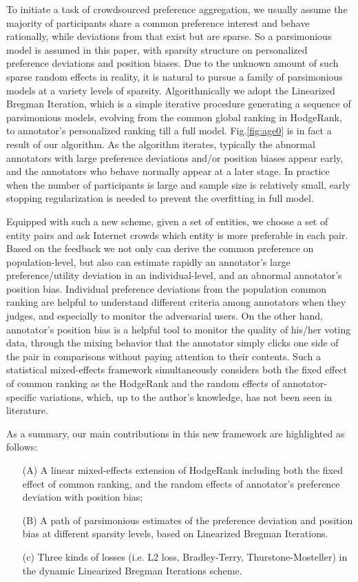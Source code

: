 \documentclass[10pt,journal,cspaper,compsoc]{IEEEtran}
\begin{document}
To initiate a task of crowdsourced preference aggregation, we usually assume the majority of participants share a common preference interest and behave rationally, while deviations from that exist but are sparse. So a parsimonious model is assumed in this paper, with sparsity structure on personalized preference deviations and position biases. Due to the unknown amount of such sparse random effects in reality, it is natural to pursue a family of parsimonious models at a variety levels of sparsity. Algorithmically we adopt the Linearized Bregman Iteration, which is a simple iterative procedure generating a sequence of parsimonious models, evolving from the common global ranking in HodgeRank, to annotator's personalized ranking till a full model. Fig.\ref{fig:age0} is in fact a result of our algorithm. As the algorithm iterates, typically the abnormal annotators with large preference deviations and/or position biases appear early, and the annotators who behave normally appear at a later stage. In practice when the number of participants is large and sample size is relatively small, early stopping regularization is needed to prevent the overfitting in full model.

Equipped with such a new scheme, given a set of entities, we choose a
set of entity pairs and ask Internet crowds which entity is more preferable
in each pair. Based on the feedback we not only can derive the common preference on population-level, but also can estimate rapidly an annotator's large preference/utility deviation in an individual-level, and an abnormal annotator's position bias. Individual preference deviations from the population common ranking are helpful to understand different criteria among annotators when they judges, and especially to monitor the adversarial users. On the other hand, annotator's position bias is a helpful tool to monitor the quality of his/her voting data, through the mixing behavior that the annotator simply clicks one side of the pair in comparisons without paying attention to their contents. Such a statistical mixed-effects framework simultaneously considers both the fixed effect of common ranking as the HodgeRank and the random effects of annotator-specific variations, which, up to the author's knowledge, has not been seen in literature.

As a summary, our main contributions in this new framework are highlighted as follows:

\begin{itemize}
\item[(A)] A linear mixed-effects extension of HodgeRank including both the fixed effect of common ranking, and the random effects of annotator's preference deviation with position bias;
\item[(B)] A path of parsimonious estimates of the preference deviation and position bias at different sparsity levels, based on Linearized Bregman Iterations.
\item[(c)] Three kinds of losses (i.e. L2 loss, Bradley-Terry, Thurstone-Mosteller) in the dynamic Linearized Bregman Iterations scheme.
\end{itemize}
\end{document}
